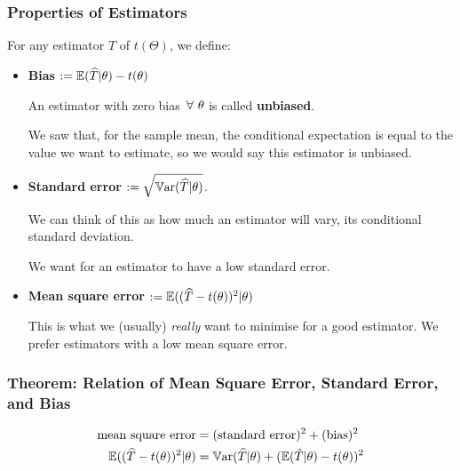 \documentclass[a4paper]{article}
\begin{document}
            \subsubsection{Properties of Estimators}
                \begin{definition}
                    For any estimator $\widehat T$ of $t(\Theta)$, we define:

                    \begin{itemize}
                        \item \textbf{Bias} $:= \mathbb{E}(\widehat T | \theta) -
                            t(\theta)$

                            An estimator with zero bias $\,\forall\,\, \theta$ is called
                            \textbf{unbiased}.

                            We saw that, for the sample mean, the conditional
                            expectation is equal to the value we want to
                            estimate, so we would say this estimator is
                            unbiased.

                        \item \textbf{Standard error} $:= \sqrt{\mathbb{V}\text{ar}(\widehat T
                            | \theta)}$.

                            We can think of this as how much an estimator will
                            vary, its conditional standard deviation.

                            We want for an estimator to have a low standard
                            error.

                        \item \textbf{Mean square error} $:= \mathbb{E}((\widehat T -
                            t(\theta))^2 | \theta)$

                            This is what we (usually) \textit{really} want to
                            minimise for a good estimator. We prefer estimators
                            with a low mean square error.
                    \end{itemize}
                \end{definition}

            \subsubsection{Theorem: Relation of Mean Square Error, Standard
            Error, and Bias}
                \begin{align*}
                    \text{mean square error} & = (\text{standard error})^2 +
                        (\text{bias})^2 \\
                    \mathbb{E}((\widehat T - t(\theta))^2 | \theta) & = \mathbb{V}\text{ar}(\widehat T
                        | \theta) + (\mathbb{E}(\hat T | \theta) - t(\theta))^2
                \end{align*}
\end{document}
